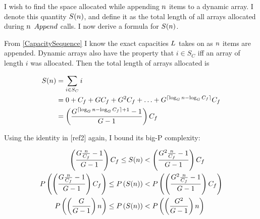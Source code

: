 \HdrSpaceComplex

I wish to find the space allocated while appending $n$ items to a dynamic array. I denote this quantity $S(n)$, and define it as the total length of all arrays allocated during $n$ $Append$ calls. I now derive a formula for $S(n)$.

From \ref{CapacitySequence} I know the exact capacities $L$ takes on as $n$ items are appended. Dynamic arrays also have the property that $i \in S_C$ iff an array of length $i$ was allocated. Then the total length of arrays allocated is

\begin{align*}
S(n) &= \sum_{i \in S_C} i\\
&= 0 + C_f + GC_f + G^2C_f + \ldots + G^{\lceil \log_{G} n - \log_{G} C_f \rceil}C_f\\
&= \left( \frac{G^{\lceil \log_{G} n - \log_{G} C_f \rceil + 1} - 1}{G - 1} \right) C_f
\end{align*}

Using the identity in [ref2] again, I bound its big-P complexity:

\begin{align*}
\left( \frac{G \frac{n}{C_f} - 1}{G - 1} \right) C_f \leq S(n) &< \left( \frac{G^2 \frac{n}{C_f} - 1}{G - 1} \right) C_f\\
P\left( \left( \frac{G \frac{n}{C_f} - 1}{G - 1} \right) C_f \right) \leq P\left( S(n) \right) &< P\left( \left( \frac{G^2 \frac{n}{C_f} - 1}{G - 1} \right) C_f \right)\\
P\left( \left( \frac{G}{G - 1} \right) n \right) \leq P\left( S(n) \right) &< P\left( \left( \frac{G^2}{G - 1} \right) n \right)
\end{align*}
